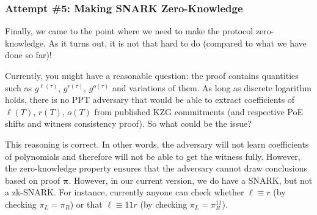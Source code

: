 \documentclass[../../book.tex]{subfiles}
\begin{document}
\subsubsection{Attempt \#5: Making SNARK Zero-Knowledge}

Finally, we came to the point where we need to make the protocol zero-knowledge. As it turns out, it is not that hard to do (compared to what we have done so far)!

\begin{remark}
    Currently, you might have a reasonable question: the proof contains quantities such as $g^{\ell(\tau)}$, $g^{r(\tau)}$, $g^{o(\tau)}$ and variations of them. As long as discrete logarithm holds, there is no PPT adversary that would be able to extract coefficients of $\ell(T)$, $r(T)$, $o(T)$ from published KZG commitments (and respective PoE shifts and witness consistency proof). So what could be the issue?

    This reasoning is correct. In other words, the adversary will not learn coefficients of polynomials and therefore will not be able to get the witness fully. However, the zero-knowledge property ensures that the adversary cannot draw conclusions based on proof $\boldsymbol{\pi}$. However, in our current version, we do have a SNARK, but not a zk-SNARK. For instance, currently anyone can check whether $\ell \equiv r$ (by checking $\pi_L = \pi_R$) or that $\ell \equiv 11r$ (by checking $\pi_L = \pi_R^{11}$).  
\end{remark}
\end{document}

